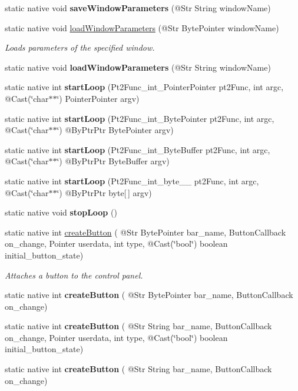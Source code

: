 \begin{DoxyCompactItemize}
static native void {\bfseries save\+Window\+Parameters} (@Str String window\+Name)
\item 
static native void \hyperlink{group__highgui__qt_gacabd2c2030cc1e76d6537ecf12821fbf}{load\+Window\+Parameters} (@Str Byte\+Pointer window\+Name)
\begin{DoxyCompactList}\small\item\em Loads parameters of the specified window. \end{DoxyCompactList}\item 
static native void {\bfseries load\+Window\+Parameters} (@Str String window\+Name)
\item 
static native int {\bfseries start\+Loop} (Pt2\+Func\+\_\+int\+\_\+\+Pointer\+Pointer pt2\+Func, int argc, @Cast(\char`\"{}char$\ast$$\ast$\char`\"{}) Pointer\+Pointer argv)
\item 
static native int {\bfseries start\+Loop} (Pt2\+Func\+\_\+int\+\_\+\+Byte\+Pointer pt2\+Func, int argc, @Cast(\char`\"{}char$\ast$$\ast$\char`\"{}) @By\+Ptr\+Ptr Byte\+Pointer argv)
\item 
static native int {\bfseries start\+Loop} (Pt2\+Func\+\_\+int\+\_\+\+Byte\+Buffer pt2\+Func, int argc, @Cast(\char`\"{}char$\ast$$\ast$\char`\"{}) @By\+Ptr\+Ptr Byte\+Buffer argv)
\item 
static native int {\bfseries start\+Loop} (Pt2\+Func\+\_\+int\+\_\+byte\+\_\+\+\_\+ pt2\+Func, int argc, @Cast(\char`\"{}char$\ast$$\ast$\char`\"{}) @By\+Ptr\+Ptr byte\mbox{[}$\,$\mbox{]} argv)
\item 
static native void {\bfseries stop\+Loop} ()
\item 
static native int \hyperlink{group__highgui__qt_ga5dc4aba06e0c07797e0dcc3dc0920d4c}{create\+Button} ( @Str Byte\+Pointer bar\+\_\+name, Button\+Callback on\+\_\+change, Pointer userdata, int type, @Cast(\char`\"{}bool\char`\"{}) boolean initial\+\_\+button\+\_\+state)
\begin{DoxyCompactList}\small\item\em Attaches a button to the control panel. \end{DoxyCompactList}\item 
static native int {\bfseries create\+Button} ( @Str Byte\+Pointer bar\+\_\+name, Button\+Callback on\+\_\+change)
\item 
static native int {\bfseries create\+Button} ( @Str String bar\+\_\+name, Button\+Callback on\+\_\+change, Pointer userdata, int type, @Cast(\char`\"{}bool\char`\"{}) boolean initial\+\_\+button\+\_\+state)
\item 
static native int {\bfseries create\+Button} ( @Str String bar\+\_\+name, Button\+Callback on\+\_\+change)
\end{DoxyCompactItemize}
